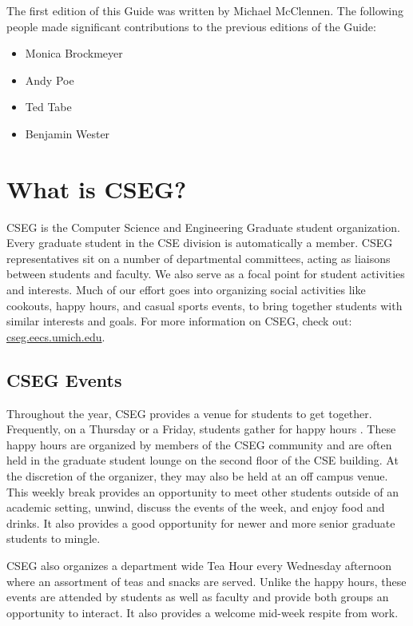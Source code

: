 \documentclass[11pt]{article}
\begin{document}
The first edition of this Guide was written by Michael McClennen.
The following people made significant contributions to the previous
editions of the Guide:

\begin{itemize}
\item Monica Brockmeyer
\item Andy Poe
\item Ted Tabe
\item Benjamin Wester
\end{itemize}
\newpage
\section{What is CSEG?}
\label{sec-2}

CSEG is the Computer Science and Engineering Graduate student
organization. Every graduate student in the CSE division is
automatically a member. CSEG representatives sit on a number of
departmental committees, acting as liaisons between students and
faculty. We also serve as a focal point for student activities and
interests. Much of our effort goes into organizing social activities
like cookouts, happy hours, and casual sports events, to bring
together students with similar interests and goals. For more
information on CSEG, check out: \href{http://cseg.eecs.umich.edu/}{cseg.eecs.umich.edu}.
\subsection{CSEG Events}
\label{sec-2_1}

Throughout the year, CSEG provides a venue for students to get
together. Frequently, on a Thursday or a Friday, students gather for
happy hours . These happy hours are organized by members of the CSEG community
and are often held in the graduate student lounge on the second floor of the CSE building. At the discretion
of the organizer, they may also be held at an off campus venue. This weekly break provides an opportunity
to meet other students outside of an academic setting, unwind, discuss the events of the week, and enjoy
food and drinks. It also provides a good opportunity for newer and more senior graduate students to
mingle.

CSEG also organizes a department wide Tea Hour every Wednesday afternoon where an assortment of
teas and snacks are served. Unlike the happy hours, these events are attended by students as well as
faculty and provide both groups an opportunity to interact. It also provides a welcome mid-week respite
from work.
\end{document}
